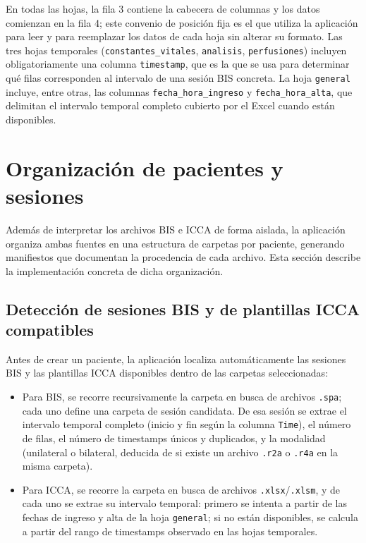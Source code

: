 \documentclass[
  spanish,
  a4paper,
  12pt,
  twoside]{memoir}
\providecommand{\tightlist}{%
  \setlength{\itemsep}{0pt}\setlength{\parskip}{0pt}}
\begin{document}
En todas las hojas, la fila 3 contiene la cabecera de columnas y los
datos comienzan en la fila 4; este convenio de posición fija es el que
utiliza la aplicación para leer y para reemplazar los datos de cada hoja
sin alterar su formato. Las tres hojas temporales
(\texttt{constantes\_vitales}, \texttt{analisis}, \texttt{perfusiones})
incluyen obligatoriamente una columna \texttt{timestamp}, que es la que
se usa para determinar qué filas corresponden al intervalo de una sesión
BIS concreta. La hoja \texttt{general} incluye, entre otras, las
columnas \texttt{fecha\_hora\_ingreso} y \texttt{fecha\_hora\_alta}, que
delimitan el intervalo temporal completo cubierto por el Excel cuando
están disponibles.

\chapter{Organización de pacientes y
sesiones}\label{organizaciuxf3n-de-pacientes-y-sesiones}

Además de interpretar los archivos BIS e ICCA de forma aislada, la
aplicación organiza ambas fuentes en una estructura de carpetas por
paciente, generando manifiestos que documentan la procedencia de cada
archivo. Esta sección describe la implementación concreta de dicha
organización.

\section{Detección de sesiones BIS y de plantillas ICCA
compatibles}\label{detecciuxf3n-de-sesiones-bis-y-de-plantillas-icca-compatibles}

Antes de crear un paciente, la aplicación localiza automáticamente las
sesiones BIS y las plantillas ICCA disponibles dentro de las carpetas
seleccionadas:

\begin{itemize}
\tightlist
\item
  Para BIS, se recorre recursivamente la carpeta en busca de archivos
  \texttt{.spa}; cada uno define una carpeta de sesión candidata. De esa
  sesión se extrae el intervalo temporal completo (inicio y fin según la
  columna \texttt{Time}), el número de filas, el número de timestamps
  únicos y duplicados, y la modalidad (unilateral o bilateral, deducida
  de si existe un archivo \texttt{.r2a} o \texttt{.r4a} en la misma
  carpeta).
\item
  Para ICCA, se recorre la carpeta en busca de archivos
  \texttt{.xlsx}/\texttt{.xlsm}, y de cada uno se extrae su intervalo
  temporal: primero se intenta a partir de las fechas de ingreso y alta
  de la hoja \texttt{general}; si no están disponibles, se calcula a
  partir del rango de timestamps observado en las hojas temporales.
\end{itemize}
\end{document}
